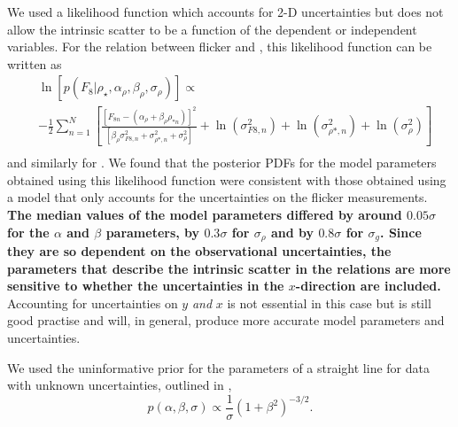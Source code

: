 We used a likelihood function which accounts for 2-D uncertainties but does
not allow the intrinsic scatter to be a function of the dependent or
independent variables.
For the relation between flicker and \rhostar, this likelihood function can be
written as
\begin{eqnarray}
	& \ln\left[p(F_8|\rho_\star, \alpha_\rho, \beta_\rho, \sigma_{\rho})\right]
        \propto  \\ \nonumber
    & -\frac{1}{2}\sum_{n=1}^N \left[\frac{[F_{8n}-(\alpha_\rho
    + \beta_\rho \rho_{*n})]^2}
	{\left[\beta_\rho \sigma_{F8, n}^2 + \sigma_{\rho *, n}^2 +
    \sigma_{\rho}^2\right]} + \ln(\sigma_{F8, n}^2) + \ln(\sigma_{\rho*, n}^2)
    + \ln(\sigma_\rho^2) \right]
	\\ \nonumber
\end{eqnarray}
\label{eq:likelihood}
and similarly for \logg.
We found that the posterior PDFs for the model parameters obtained using this
likelihood function were consistent with those obtained using a model that
only accounts for the uncertainties on the flicker measurements.
{\bf The median values of the model parameters differed by around $0.05
\sigma$ for the $\alpha$ and $\beta$ parameters, by $0.3 \sigma$ for
$\sigma_\rho$ and by $0.8 \sigma$ for $\sigma_g$.
Since they are so dependent on the observational uncertainties, the parameters
that describe the intrinsic scatter in the relations are more sensitive to
whether the uncertainties in the $x$-direction are included.}
Accounting for uncertainties on $y$ {\it and} $x$ is not essential in this
case but is still good practise and will, in general, produce more accurate
model parameters and uncertainties.


We used the uninformative prior for the parameters of a straight line for
data with unknown uncertainties, outlined in \citet{vanderplas},
\begin{equation}
p(\alpha, \beta, \sigma) \propto \frac{1}{\sigma} \left( 1 + \beta^2
\right)^{-3/2}.
\end{equation}
\label{eq:priors}



